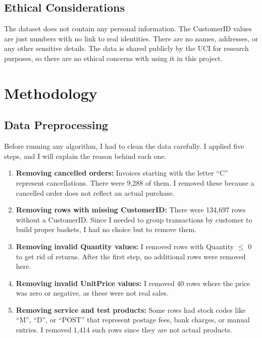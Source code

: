 \documentclass[conference]{IEEEtran}
\begin{document}
\subsection{Ethical Considerations}

The dataset does not contain any personal information. The CustomerID values are just numbers with no link to real identities. There are no names, addresses, or any other sensitive details. The data is shared publicly by the UCI for research purposes, so there are no ethical concerns with using it in this project.

\section{Methodology}
\label{sec:methodology}

\subsection{Data Preprocessing}

Before running any algorithm, I had to clean the data carefully. I applied five steps, and I will explain the reason behind each one.

\begin{enumerate}
    \item \textbf{Removing cancelled orders:} Invoices starting with the letter ``C'' represent cancellations. There were 9,288 of them. I removed these because a cancelled order does not reflect an actual purchase.
    \item \textbf{Removing rows with missing CustomerID:} There were 134,697 rows without a CustomerID. Since I needed to group transactions by customer to build proper baskets, I had no choice but to remove them.
    \item \textbf{Removing invalid Quantity values:} I removed rows with Quantity $\leq$ 0 to get rid of returns. After the first step, no additional rows were removed here.
    \item \textbf{Removing invalid UnitPrice values:} I removed 40 rows where the price was zero or negative, as these were not real sales.
    \item \textbf{Removing service and test products:} Some rows had stock codes like ``M'', ``D'', or ``POST'' that represent postage fees, bank charges, or manual entries. I removed 1,414 such rows since they are not actual products.
\end{enumerate}
\end{document}

